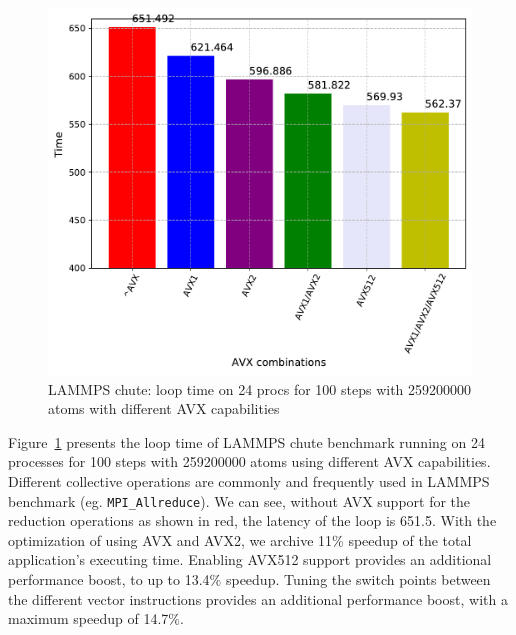 \documentclass[5p,times,twocolumn]{elsarticle}
\newcommand{\mpifunc}[1]{\lstinline"MPI_#1"\xspace}
\begin{document}
\begin{figure}[h]
    \centering
    \includegraphics[width=\linewidth]{lammps_avx_review.pdf}
    \caption{LAMMPS chute: loop time on 24 procs for 100 steps with 259200000 atoms with different AVX capabilities}
    \label{fig:lammpsavx}
\end{figure}

Figure~\ref{fig:lammpsavx} presents the loop time of LAMMPS chute benchmark running
on 24 processes for 100 steps with 259200000 atoms using different AVX capabilities.
Different collective operations are commonly and frequently used in LAMMPS benchmark (eg. \mpifunc{Allreduce}).
We can see, without AVX support for the reduction operations as shown in red, the latency of the loop is 651.5.
With the optimization of using AVX and AVX2, we archive 11\% speedup of the total application's executing time. Enabling  AVX512 support provides an additional performance boost, to up to 13.4\% speedup. Tuning the switch points between the different vector instructions provides an additional performance boost, with a maximum speedup of 14.7\%.
\end{document}
